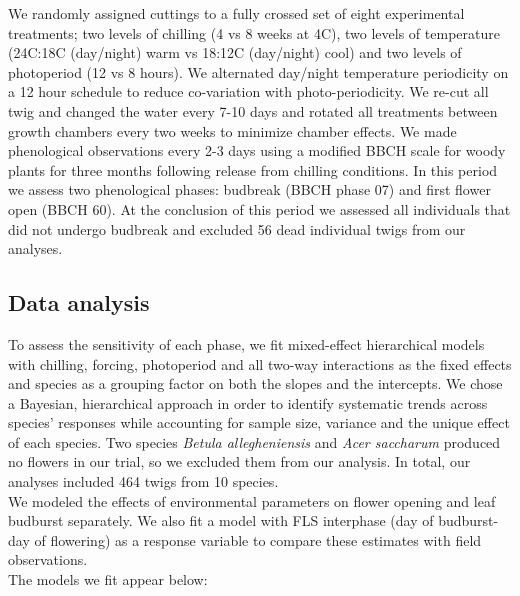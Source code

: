 \documentclass[11pt]{article}\usepackage[]{graphicx}\usepackage[]{color}
\begin{document}
\noindent We randomly assigned cuttings to a fully crossed set of eight experimental treatments; two levels of chilling (4 vs 8 weeks at 4\degree C), two levels of temperature (24\degree C:18\degree C (day/night) warm vs 18\degree:12\degree C (day/night) cool) and two levels of photoperiod (12 vs 8 hours). We alternated day/night temperature periodicity on a 12 hour schedule to reduce co-variation with photo-periodicity. We re-cut all twig and changed the water every 7-10 days and rotated all treatments between growth chambers every two weeks to minimize chamber effects. We made phenological observations every 2-3 days using a modified BBCH scale for woody plants \citep{Finn2007} for three months following release from chilling conditions. In this period we assess two phenological phases: budbreak (BBCH phase 07) %
and first flower open (BBCH 60). At the conclusion of this period we assessed all individuals that did not undergo budbreak and excluded 56 dead individual twigs from our analyses. 

\subsection*{Data analysis}
\noindent To assess the sensitivity of each phase, we fit mixed-effect hierarchical models with chilling, forcing, photoperiod and all two-way interactions as the fixed effects and species as a grouping factor on both the slopes and the intercepts. We chose a Bayesian, hierarchical approach in order to identify systematic trends across species' responses while accounting for sample size, variance and the unique effect of each species. Two species \textit{Betula allegheniensis} and \textit{Acer saccharum} produced no flowers in our trial, so we excluded them from our analysis. In total, our analyses included 464 twigs from 10 species. \\

\noident We modeled the effects of environmental parameters on flower opening and leaf budburst separately. We also fit a model with FLS interphase (day of budburst- day of flowering) as a response variable to compare these estimates with field observations.\\

The models we fit appear below:\\
\end{document}

